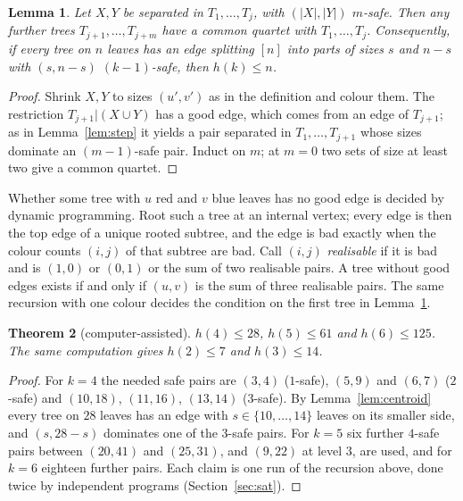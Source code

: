 \documentclass[11pt]{amsart}
\newtheorem{theorem}{Theorem}[section]
\newtheorem{lemma}[theorem]{Lemma}
\theoremstyle{remark}
\begin{document}
\begin{lemma}\label{lem:safe}
Let $X,Y$ be separated in $T_1,\dots,T_j$, with $(|X|,|Y|)$ $m$-safe. Then any further trees $T_{j+1},\dots,T_{j+m}$ have a common quartet with $T_1,\dots,T_j$. Consequently, if every tree on $n$ leaves has an edge splitting $[n]$ into parts of sizes $s$ and $n-s$ with $(s,n-s)$ $(k-1)$-safe, then $h(k)\le n$.
\end{lemma}

\begin{proof}
Shrink $X,Y$ to sizes $(u',v')$ as in the definition and colour them. The restriction $T_{j+1}|(X\cup Y)$ has a good edge, which comes from an edge of $T_{j+1}$; as in Lemma~\ref{lem:step} it yields a pair separated in $T_1,\dots,T_{j+1}$ whose sizes dominate an $(m-1)$-safe pair. Induct on $m$; at $m=0$ two sets of size at least two give a common quartet.
\end{proof}

Whether some tree with $u$ red and $v$ blue leaves has no good edge is decided by dynamic programming. Root such a tree at an internal vertex; every edge is then the top edge of a unique rooted subtree, and the edge is bad exactly when the colour counts $(i,j)$ of that subtree are bad. Call $(i,j)$ \emph{realisable} if it is bad and is $(1,0)$ or $(0,1)$ or the sum of two realisable pairs. A tree without good edges exists if and only if $(u,v)$ is the sum of three realisable pairs. The same recursion with one colour decides the condition on the first tree in Lemma~\ref{lem:safe}.

\begin{theorem}[computer-assisted]\label{thm:smallk}
$h(4)\le28$, $h(5)\le61$ and $h(6)\le125$. The same computation gives $h(2)\le7$ and $h(3)\le14$.
\end{theorem}

\begin{proof}
For $k=4$ the needed safe pairs are $(3,4)$ ($1$-safe), $(5,9)$ and $(6,7)$ ($2$-safe) and $(10,18)$, $(11,16)$, $(13,14)$ ($3$-safe). By Lemma~\ref{lem:centroid} every tree on $28$ leaves has an edge with $s\in\{10,\dots,14\}$ leaves on its smaller side, and $(s,28-s)$ dominates one of the $3$-safe pairs. For $k=5$ six further $4$-safe pairs between $(20,41)$ and $(25,31)$, and $(9,22)$ at level $3$, are used, and for $k=6$ eighteen further pairs. Each claim is one run of the recursion above, done twice by independent programs (Section~\ref{sec:sat}).
\end{proof}
\end{document}
